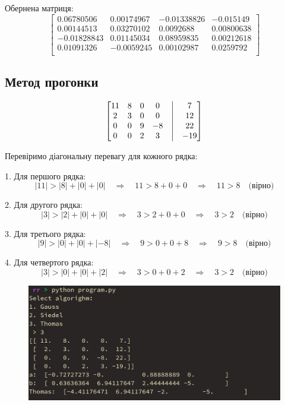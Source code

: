 \documentclass[a4paper, 12pt]{article}
\begin{document}
Обернена матриця: 
\[
\left[
\begin{array}{cccc}
0.06780506 & 0.00174967 & -0.01338826 & -0.015149 \\
0.00144513 & 0.03270102 & 0.0092688 & 0.00800638 \\
-0.01828843 & 0.01145034 & 0.08959835 & 0.00212618 \\
0.01091326 & -0.0059245 & 0.00102987 & 0.0259792 \\
\end{array}
\right]
\]


\clearpage
\subsection{Метод прогонки}

\[
\begin{bmatrix}
11 & 8 & 0 & 0 &\bigm| & 7 \\ 
2 & 3 & 0 & 0 &\bigm| & 12 \\
0 & 0 & 9 & -8 &\bigm| & 22 \\
0 & 0 & 2 & 3 &\bigm| & -19
\end{bmatrix}
\]

Перевіримо діагональну перевагу для кожного рядка:

1. Для першого рядка:
   \[
   |11| > |8| + |0| + |0| \quad \Rightarrow \quad 11 > 8 + 0 + 0 \quad \Rightarrow \quad 11 > 8 \quad \text{(вірно)}
   \]

2. Для другого рядка:
   \[
   |3| > |2| + |0| + |0| \quad \Rightarrow \quad 3 > 2 + 0 + 0 \quad \Rightarrow \quad 3 > 2 \quad \text{(вірно)}
   \]

3. Для третього рядка:
   \[
   |9| > |0| + |0| + |-8| \quad \Rightarrow \quad 9 > 0 + 0 + 8 \quad \Rightarrow \quad 9 > 8 \quad \text{(вірно)}
   \]

4. Для четвертого рядка:
   \[
   |3| > |0| + |0| + |2| \quad \Rightarrow \quad 3 > 0 + 0 + 2 \quad \Rightarrow \quad 3 > 2 \quad \text{(вірно)}
   \]


\begin{figure}[h]
	\centering
	\includegraphics[width=0.8\linewidth]{thomas_result.png}
\end{figure}
\end{document}
